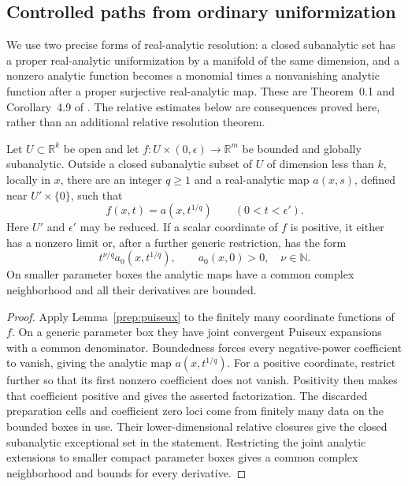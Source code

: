 \subsection{Controlled paths from ordinary uniformization}

We use two precise forms of real-analytic resolution: a closed
subanalytic set has a proper real-analytic uniformization by a manifold
of the same dimension, and a nonzero analytic function becomes a
monomial times a nonvanishing analytic function after a proper
surjective real-analytic map.  These are Theorem~0.1 and Corollary~4.9 of
\cite{BierstoneMilman1988}.  The relative estimates below are consequences
proved here, rather than an additional relative resolution theorem.

\begin{lemma}
\label{loc:puiseux}
Let $U\subset\mathbb R^k$ be open and let
$f:U\times(0,\epsilon)\to\mathbb R^m$ be bounded and globally subanalytic.
Outside a closed subanalytic subset of $U$ of dimension less than $k$,
locally in $x$, there are an integer $q\geq1$ and a real-analytic map
$a(x,s)$, defined near $U'\times\{0\}$, such that
\[
                 f(x,t)=a(x,t^{1/q})\qquad(0<t<\epsilon').
\]
Here $U'$ and $\epsilon'$ may be reduced.  If a scalar coordinate of $f$
is positive, it either has a nonzero limit or, after a further generic
restriction, has the form
\[
                 t^{\nu/q}a_0(x,t^{1/q}),\qquad a_0(x,0)>0,
                 \quad \nu\in\mathbb N.
\]
On smaller parameter boxes the analytic maps have a common complex
neighborhood and all their derivatives are bounded.
\end{lemma}

\begin{proof}
Apply Lemma~\ref{prep:puiseux} to the finitely many coordinate
functions of $f$.  On a generic parameter box they have joint
convergent Puiseux expansions with a common denominator.  Boundedness
forces every negative-power coefficient to vanish, giving the
analytic map $a(x,t^{1/q})$.  For a positive coordinate, restrict
further so that its first nonzero coefficient does not vanish.
Positivity then makes that coefficient positive and gives the
asserted factorization.  The discarded preparation cells and
coefficient zero loci come from finitely many data on the bounded
boxes in use.  Their lower-dimensional relative closures give the
closed subanalytic exceptional set in the statement.  Restricting
the joint analytic extensions to smaller compact parameter boxes
gives a common complex neighborhood and bounds for every derivative.
\end{proof}

